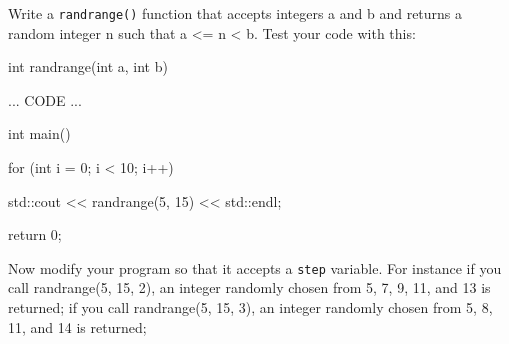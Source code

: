 Write a \texttt{randrange()} function that accepts integers a and b and returns a random integer n such that a <= n < b. Test your code with this:



\begin{consolethree}[escapeinside=||]

int randrange(int a, int b)

{

    ... CODE ...

}



int main()

{

    for (int i = 0; i < 10; i++)

    {

        std::cout << randrange(5, 15) << std::endl;

    }

    return 0;

}

\end{consolethree}



Now modify your program so that it accepts a \texttt{step} variable. For instance if you call randrange(5, 15, 2), an integer randomly chosen from 5, 7, 9, 11, and 13 is returned; if you call randrange(5, 15, 3), an integer randomly chosen from 5, 8, 11, and 14 is returned;

